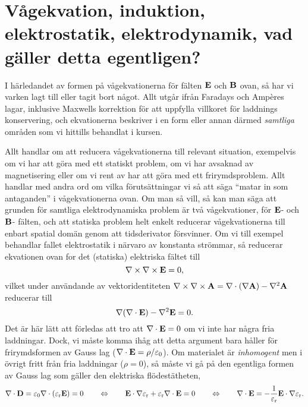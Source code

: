 \section{V{\aa}gekvation, induktion, elektrostatik, elektrodynamik, vad
         g{\"a}ller detta egentligen?}
I h{\"a}rledandet av formen p{\aa} v{\aa}gekvationerna f{\"o}r f{\"a}lten
${\bf E}$ och ${\bf B}$ ovan, s{\aa} har vi varken lagt till eller tagit bort
n{\aa}got. Allt utg{\aa}r ifr{\aa}n Faradays och Amp\`eres lagar, inklusive
Maxwells korrektion f{\"o}r att uppfylla villkoret f{\"o}r laddnings\-%
konservering, och ekvationerna beskriver i en form eller annan d{\"a}rmed
{\it samtliga} omr{\aa}den som vi hittills behandlat i kursen.

Allt handlar om att reducera v{\aa}gekvationerna till relevant situation,
exempelvis om vi har att g{\"o}ra med ett statiskt problem, om vi har avsaknad
av magnetisering eller om vi rent av har att g{\"o}ra med ett frirymdsproblem.
Allt handlar med andra ord om vilka f{\"o}ruts{\"a}ttningar vi s{\aa} att
s{\"a}ga ``matar in som antaganden'' i v{\aa}gekvationerna ovan. Om man s{\aa}
vill, s{\aa} kan man s{\"a}ga att grunden f{\"o}r samtliga elektrodynamiska
problem {\"a}r tv{\aa} v{\aa}gekvationer, f{\"o}r ${\bf E}$- och ${\bf B}$-%
f{\"a}lten, och att statiska problem helt enkelt reducerar v{\aa}gekvationerna
till enbart spatial dom{\"a}n genom att tidsderivator f{\"o}rsvinner.
\bigskip
{}
\smallskip
\noindent
Om vi till exempel behandlar fallet elektrostatik i n{\"a}rvaro av konstanta
str{\"o}mmar, s{\aa} reducerar ekvationen ovan for det (statiska) elektriska
f{\"a}ltet till
$$
  \nabla\times\nabla\times{\bf E}=0,
$$
vilket under anv{\"a}ndande av vektoridentiteten
$\nabla\times\nabla\times{\bf A}=\nabla\cdot(\nabla{\bf A})-\nabla^2{\bf A}$
reducerar till
$$
  \nabla(\nabla\cdot{\bf E})-\nabla^2{\bf E}=0.
$$
Det {\"a}r h{\"a}r l{\"a}tt att f{\"o}rledas att tro att $\nabla\cdot{\bf E}=0$
om vi inte har n{\aa}gra fria laddningar. Dock, vi m{\aa}ste komma ih{\aa}g att
detta argument bara h{\aa}ller f{\"o}r frirymdsformen av Gauss lag
($\nabla\cdot{\bf E}=\rho/\varepsilon_0$). Om materialet {\"a}r {\it inhomogent}
men i {\"o}vrigt fritt fr{\aa}n fria laddningar ($\rho=0$), s{\aa} m{\aa}ste vi
g{\aa} p{\aa} den egentliga formen av Gauss lag som g{\"a}ller den elektriska
fl{\"o}dest{\"a}theten,
$$
  \nabla\cdot{\bf D}
    =\varepsilon_0\nabla\cdot(\varepsilon_{\rm r}{\bf E})=0
  \qquad\Leftrightarrow\qquad
  {\bf E}\cdot\nabla\varepsilon_{\rm r}+
    \varepsilon_{\rm r}\nabla\cdot{\bf E}=0
  \qquad\Leftrightarrow\qquad
  \nabla\cdot{\bf E}=
    -{{1}\over{\varepsilon_{\rm r}}}{\bf E}\cdot\nabla\varepsilon_{\rm r}.
$$
